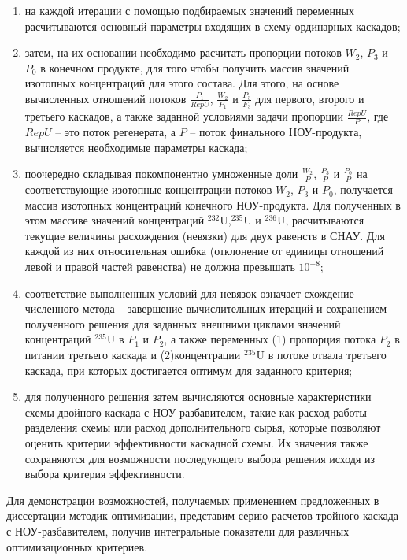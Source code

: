 \begin{enumerate}
    \item  на каждой итерации с помощью подбираемых значений переменных расчитываются основный параметры входящих в схему ординарных каскадов;
    \item  затем, на их основании необходимо расчитать пропорции потоков $W_2$, $P_3$ и $P_0$ в конечном продукте, для того чтобы получить массив значений изотопных концентраций для этого состава. Для этого, на основе вычисленных отношений потоков $\frac{P_{1}}{RepU}$, $\frac{W_{2}}{P_{1}}$ и $\frac{P_{3}}{F_{3}}$ для первого, второго и третьего каскадов, а также заданной условиями задачи пропорции $\frac{RepU}{P}$, где $RepU$ -- это поток регенерата, а $P$ -- поток финального НОУ-продукта, вычисляется необходимые параметры каскада;
    \item поочередно складывая покомпонентно умноженные доли $\frac{W_{2}}{P}$, $\frac{P_{3}}{P}$ и $\frac{P_{0}}{P}$ на соответствующие изотопные концентрации потоков $W_2$, $P_3$ и $P_0$, получается массив изотопных концентраций конечного НОУ-продукта. Для полученных в этом массиве значений концентраций $^{232}$U,$^{235}$U и $^{236}$U, расчитываются текущие величины расхождения (невязки) для двух равенств в СНАУ. Для каждой из них относительная ошибка (отклонение от единицы отношений левой и правой частей равенства) не должна превышать $10^{-8}$;
    \item соответствие выполненных условий для невязок означает схождение численного метода -- завершение вычислительных итераций и сохранением полученного решения для заданных внешними циклами значений концентраций $^{235}$U в $P_1$ и $P_2$, а также переменных (1) пропорция потока $P_2$ в питании третьего каскада и (2)концентрации $^{235}$U в потоке отвала третьего каскада, при которых достигается оптимум для заданного критерия;
    \item для полученного решения затем вычисляются основные характеристики схемы двойного каскада с НОУ-разбавителем, такие как расход работы разделения схемы или расход дополнительного сырья, которые позволяют оценить критерии эффективности каскадной схемы. Их значения также сохраняются для возможности последующего выбора решения исходя из выбора критерия эффективности.
\end{enumerate}



Для демонстрации возможностей, получаемых применением предложенных в диссертации методик оптимизации, представим серию расчетов тройного каскада с НОУ-разбавителем, получив интегральные показатели для различных оптимизационных критериев.


